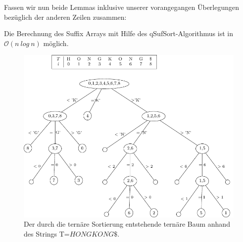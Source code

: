 Fassen wir nun beide Lemmas inklusive unserer vorangegangen Überlegungen bezüglich der anderen Zeilen zusammen: 
\begin{lemma}
Die Berechnung des Suffix Arrays mit Hilfe des qSufSort-Algorithmus ist in $\mathcal{O}(n \ log \ n)$ möglich.
\end{lemma}
\begin{figure}[t]
\centering
\includegraphics[scale=0.9]{kapitel/saca_algorithmen/qsufsort/Bilder/TerTree.pdf}
\caption{Der durch die ternäre Sortierung entstehende ternäre Baum anhand des Strings T=$HONGKONG\$$.}
\label{terTree}
\end{figure}